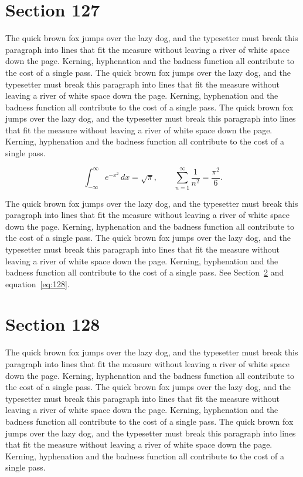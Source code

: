 \documentclass{article}
\begin{document}
\section{Section 127}
\label{sec:127}
The quick brown fox jumps over the lazy dog, and the typesetter must break this paragraph into lines that fit the measure without leaving a river of white space down the page. Kerning, hyphenation and the badness function all contribute to the cost of a single pass. The quick brown fox jumps over the lazy dog, and the typesetter must break this paragraph into lines that fit the measure without leaving a river of white space down the page. Kerning, hyphenation and the badness function all contribute to the cost of a single pass. The quick brown fox jumps over the lazy dog, and the typesetter must break this paragraph into lines that fit the measure without leaving a river of white space down the page. Kerning, hyphenation and the badness function all contribute to the cost of a single pass. 

\begin{equation}\label{eq:127}
\int_{-\infty}^{\infty} e^{-x^{2}}\,dx = \sqrt{\pi}, \qquad
\sum_{n=1}^{\infty} \frac{1}{n^{2}} = \frac{\pi^{2}}{6}.
\end{equation}

The quick brown fox jumps over the lazy dog, and the typesetter must break this paragraph into lines that fit the measure without leaving a river of white space down the page. Kerning, hyphenation and the badness function all contribute to the cost of a single pass. The quick brown fox jumps over the lazy dog, and the typesetter must break this paragraph into lines that fit the measure without leaving a river of white space down the page. Kerning, hyphenation and the badness function all contribute to the cost of a single pass. 
See Section~\ref{sec:128} and equation~\eqref{eq:128}.
\section{Section 128}
\label{sec:128}
The quick brown fox jumps over the lazy dog, and the typesetter must break this paragraph into lines that fit the measure without leaving a river of white space down the page. Kerning, hyphenation and the badness function all contribute to the cost of a single pass. The quick brown fox jumps over the lazy dog, and the typesetter must break this paragraph into lines that fit the measure without leaving a river of white space down the page. Kerning, hyphenation and the badness function all contribute to the cost of a single pass. The quick brown fox jumps over the lazy dog, and the typesetter must break this paragraph into lines that fit the measure without leaving a river of white space down the page. Kerning, hyphenation and the badness function all contribute to the cost of a single pass. 
\end{document}
